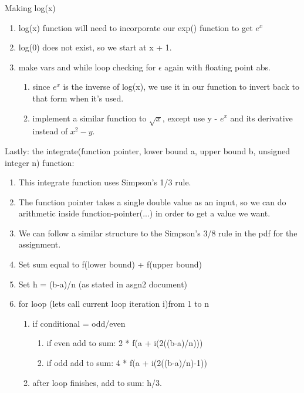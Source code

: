 \documentclass[11pt]{article}
\begin{document}
Making log(x)
\begin{enumerate}
	\item log(x) function will need to incorporate our exp() function to get \(e^x\)
	\item log(0) does not exist, so we start at x + 1.
	\item make vars and while loop checking for $\epsilon$ again with floating point abs.
	\begin{enumerate}
		\item since \(e^x\) is the inverse of log(x), we use it in our function to invert back to that form when it's used.
		\item implement a similar function to \(\sqrt{x}\), except use y - \(e^x\) and its derivative instead of \(x^2 - y\).
	\end{enumerate}
\end{enumerate}
Lastly: the integrate(function pointer, lower bound a, upper bound b, unsigned integer n) function:
\begin{enumerate}
	\item This integrate function uses Simpson's 1/3 rule.
	\item The function pointer takes a single double value as an input, so we can do arithmetic inside function-pointer(...) in order to get a value we want.
	\item We can follow a similar structure to the Simpson's 3/8 rule in the pdf for the assignment.
	\item Set sum equal to f(lower bound) + f(upper bound)
	\item Set h = (b-a)/n (as stated in asgn2 document)
	\item for loop (lets call current loop iteration i)from 1 to n
	\begin{enumerate}
		\item if conditional = odd/even
		\begin{enumerate}
			\item if even add to sum: 2 * f(a + i(2((b-a)/n)))
			\item if odd add to sum:  4 * f(a + i(2((b-a)/n)-1))
		\end{enumerate}
	\item after loop finishes, add to sum: h/3.
	\end{enumerate}
\end{enumerate}
\end{document}
